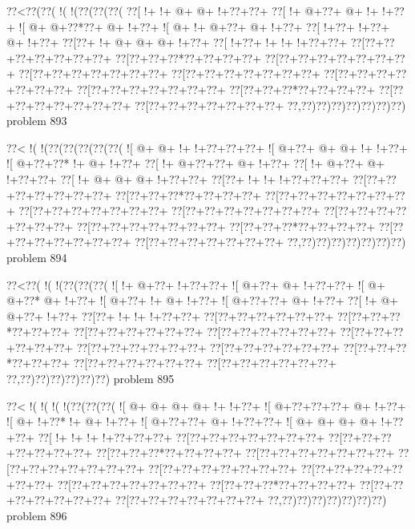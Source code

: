 \vbox{\vbox{\goo
\0??<\0??(\0??(\- !(\- !(\0??(\0??(\0??(
\0??[\- !+\- !+\- @+\- @+\- !+\0??+\0??+
\0??[\- !+\- @+\0??+\- @+\- !+\- !+\0??+
\- ![\- @+\- @+\0??*\0??+\- @+\- !+\0??+
\- ![\- @+\- !+\- @+\0??+\- @+\- !+\0??+
\0??[\- !+\0??+\- !+\0??+\- @+\- !+\0??+
\0??[\0??+\- !+\- @+\- @+\- @+\- !+\0??+
\0??[\- !+\0??+\- !+\- !+\- !+\0??+\0??+
\0??[\0??+\0??+\0??+\0??+\0??+\0??+\0??+
\0??[\0??+\0??+\0??*\0??+\0??+\0??+\0??+
\0??[\0??+\0??+\0??+\0??+\0??+\0??+\0??+
\0??[\0??+\0??+\0??+\0??+\0??+\0??+\0??+
\0??[\0??+\0??+\0??+\0??+\0??+\0??+\0??+
\0??[\0??+\0??+\0??+\0??+\0??+\0??+\0??+
\0??[\0??+\0??+\0??+\0??+\0??+\0??+\0??+
\0??[\0??+\0??+\0??*\0??+\0??+\0??+\0??+
\0??[\0??+\0??+\0??+\0??+\0??+\0??+\0??+
\0??[\0??+\0??+\0??+\0??+\0??+\0??+\0??+
\0??,\0??)\0??)\0??)\0??)\0??)\0??)\0??)
}
\hfil problem 893\hfil\break
}

\vbox{\vbox{\goo
\0??<\- !(\- !(\0??(\0??(\0??(\0??(\0??(
\- ![\- @+\- @+\- !+\- !+\0??+\0??+\0??+
\- ![\- @+\0??+\- @+\- @+\- !+\- !+\0??+
\- ![\- @+\0??+\0??*\- !+\- @+\- !+\0??+
\0??[\- !+\- @+\0??+\0??+\- @+\- !+\0??+
\0??[\- !+\- @+\0??+\- @+\- !+\0??+\0??+
\0??[\- !+\- @+\- @+\- @+\- !+\0??+\0??+
\0??[\0??+\- !+\- !+\- !+\0??+\0??+\0??+
\0??[\0??+\0??+\0??+\0??+\0??+\0??+\0??+
\0??[\0??+\0??+\0??*\0??+\0??+\0??+\0??+
\0??[\0??+\0??+\0??+\0??+\0??+\0??+\0??+
\0??[\0??+\0??+\0??+\0??+\0??+\0??+\0??+
\0??[\0??+\0??+\0??+\0??+\0??+\0??+\0??+
\0??[\0??+\0??+\0??+\0??+\0??+\0??+\0??+
\0??[\0??+\0??+\0??+\0??+\0??+\0??+\0??+
\0??[\0??+\0??+\0??*\0??+\0??+\0??+\0??+
\0??[\0??+\0??+\0??+\0??+\0??+\0??+\0??+
\0??[\0??+\0??+\0??+\0??+\0??+\0??+\0??+
\0??,\0??)\0??)\0??)\0??)\0??)\0??)\0??)
}
\hfil problem 894\hfil\break
}

\vbox{\vbox{\goo
\0??<\0??(\- !(\- !(\0??(\0??(\0??(
\- ![\- !+\- @+\0??+\- !+\0??+\0??+
\- ![\- @+\0??+\- @+\- !+\0??+\0??+
\- ![\- @+\- @+\0??*\- @+\- !+\0??+
\- ![\- @+\0??+\- !+\- @+\- !+\0??+
\- ![\- @+\0??+\0??+\- @+\- !+\0??+
\0??[\- !+\- @+\- @+\0??+\- !+\0??+
\0??[\0??+\- !+\- !+\- !+\0??+\0??+
\0??[\0??+\0??+\0??+\0??+\0??+\0??+
\0??[\0??+\0??+\0??*\0??+\0??+\0??+
\0??[\0??+\0??+\0??+\0??+\0??+\0??+
\0??[\0??+\0??+\0??+\0??+\0??+\0??+
\0??[\0??+\0??+\0??+\0??+\0??+\0??+
\0??[\0??+\0??+\0??+\0??+\0??+\0??+
\0??[\0??+\0??+\0??+\0??+\0??+\0??+
\0??[\0??+\0??+\0??*\0??+\0??+\0??+
\0??[\0??+\0??+\0??+\0??+\0??+\0??+
\0??[\0??+\0??+\0??+\0??+\0??+\0??+
\0??,\0??)\0??)\0??)\0??)\0??)\0??)
}
\hfil problem 895\hfil\break
}

\vbox{\vbox{\goo
\0??<\- !(\- !(\- !(\- !(\0??(\0??(\0??(
\- ![\- @+\- @+\- @+\- @+\- !+\- !+\0??+
\- ![\- @+\0??+\0??+\0??+\- @+\- !+\0??+
\- ![\- @+\- !+\0??*\- !+\- @+\- !+\0??+
\- ![\- @+\0??+\0??+\- @+\- !+\0??+\0??+
\- ![\- @+\- @+\- @+\- @+\- !+\0??+\0??+
\0??[\- !+\- !+\- !+\- !+\0??+\0??+\0??+
\0??[\0??+\0??+\0??+\0??+\0??+\0??+\0??+
\0??[\0??+\0??+\0??+\0??+\0??+\0??+\0??+
\0??[\0??+\0??+\0??*\0??+\0??+\0??+\0??+
\0??[\0??+\0??+\0??+\0??+\0??+\0??+\0??+
\0??[\0??+\0??+\0??+\0??+\0??+\0??+\0??+
\0??[\0??+\0??+\0??+\0??+\0??+\0??+\0??+
\0??[\0??+\0??+\0??+\0??+\0??+\0??+\0??+
\0??[\0??+\0??+\0??+\0??+\0??+\0??+\0??+
\0??[\0??+\0??+\0??*\0??+\0??+\0??+\0??+
\0??[\0??+\0??+\0??+\0??+\0??+\0??+\0??+
\0??[\0??+\0??+\0??+\0??+\0??+\0??+\0??+
\0??,\0??)\0??)\0??)\0??)\0??)\0??)\0??)
}
\hfil problem 896\hfil\break
}

